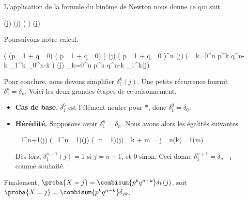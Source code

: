 L'application de la formule du binôme de Newton nous donne ce qui suit.

\begin{stepcalc}[style=sar]
\explnext{}
	\lawvar(j)
\explnext{}
	\lawvar[X_1 + \cdots + X_n](j)
	( \lawvar[X_1] \ast \cdots \ast \lawvar[X_n] ) (j)
\end{stepcalc}
	
Poursuivons notre calcul.

\begin{stepcalc}[style=sar]
\explnext{}
	\big( (p \delta_{1} + q \delta_{0}) \ast \cdots \ast ( p \delta_{1} + q \delta_{0}) \big) (j)
	( p \delta_{1} + q \delta_{0} )^n (j)
\explnext{}
	\big( \dsum_{k=0}^n \combi[n][k] p^k q^{n-k} \delta_{1}^k \ast \delta_{0}^{n-k} \big) (j)
	\dsum_{k=0}^n \combi[n][k] p^k q^{n-k} \delta_{1}^k(j)
\end{stepcalc}


Pour conclure, nous devons simplifier $\delta_{1}^k(j)$.
Une petite récurrence fournit $\delta_{1}^k = \delta_k$.
Voici les deux grandes étapes de ce raisonnement.
%
\begin{itemize}
	\item \textbf{Cas de base.}
	$\delta_{1}^0$ est l'élément neutre pour $\ast$, donc $\delta_{1}^0 = \delta_0$.


	\item \textbf{Hérédité.}
	Supposons avoir $\delta_{1}^n = \delta_n$. Nous avons alors les égalités suivantes.

	\begin{stepcalc}[style=sar]
		\kern-10pt\delta_{1}^{n+1}(j)
	\explnext{}
		(\delta_{1}^{n} \ast \delta_{1})(j)
	\explnext{}
		(\delta_{n} \ast \delta_{1})(j)
	\explnext{}
		\dsum_{k + m = j} \delta_{n}(k) \delta_{1}(m)
	\end{stepcalc}
	
	\noindent
	Dès lors,
	$\delta_{1}^{n+1}(j) = 1$ si $j=n+1$, et $0$ sinon.
	Ceci donne $\delta_{1}^{n+1} = \delta_{n+1}$ comme souhaité.
\end{itemize}


Finalement,
$\proba{X = j} = \combisum{p^k q^{n-k}} \delta_{k}(j)$,
soit
$\proba{X = j} = \combisum{p^k q^{n-k}} \delta_{jk}$.